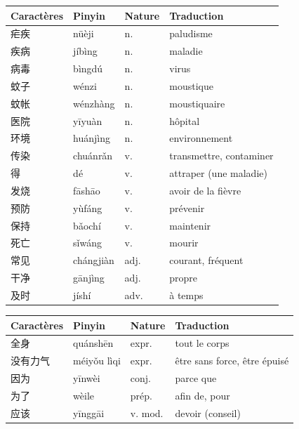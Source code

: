 \documentclass[11pt]{article}
\begin{document}
\begin{center}
\begin{tabularx}{\linewidth}{|X|X|X|X|}
\hline
\rowcolor{popblueL} Caractères & Pinyin & Nature & Traduction \\
\hline
疟疾 & nüèji & n. & paludisme \\
\hline
疾病 & jíbìng & n. & maladie \\
\hline
病毒 & bìngdú & n. & virus \\
\hline
蚊子 & wénzi & n. & moustique \\
\hline
蚊帐 & wénzhàng & n. & moustiquaire \\
\hline
医院 & yīyuàn & n. & hôpital \\
\hline
环境 & huánjìng & n. & environnement \\
\hline
传染 & chuánrǎn & v. & transmettre, contaminer \\
\hline
得 & dé & v. & attraper (une maladie) \\
\hline
发烧 & fāshāo & v. & avoir de la fièvre \\
\hline
预防 & yùfáng & v. & prévenir \\
\hline
保持 & bǎochí & v. & maintenir \\
\hline
死亡 & sǐwáng & v. & mourir \\
\hline
常见 & chángjiàn & adj. & courant, fréquent \\
\hline
干净 & gānjìng & adj. & propre \\
\hline
及时 & jíshí & adv. & à temps \\
\hline
\end{tabularx}
\end{center}

\begin{center}
\begin{tabularx}{\linewidth}{|X|X|X|X|}
\hline
\rowcolor{popblueL} Caractères & Pinyin & Nature & Traduction \\
\hline
全身 & quánshēn & expr. & tout le corps \\
\hline
没有力气 & méiyǒu lìqi & expr. & être sans force, être épuisé \\
\hline
因为 & yīnwèi & conj. & parce que \\
\hline
为了 & wèile & prép. & afin de, pour \\
\hline
应该 & yīnggāi & v. mod. & devoir (conseil) \\
\hline
\end{tabularx}
\end{center}
\end{document}
